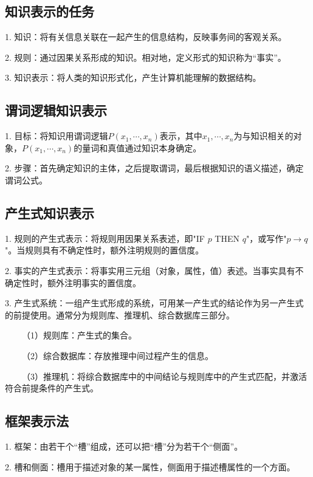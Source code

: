 \begin{tcolorbox}[colback=red!5,colframe=red!75!black]
\end{tcolorbox}

\subsection{知识表示的任务}

1. 知识：将有关信息关联在一起产生的信息结构，反映事务间的客观关系。

2. 规则：通过因果关系形成的知识。相对地，定义形式的知识称为“事实”。

3. 知识表示：将人类的知识形式化，产生计算机能理解的数据结构。

\subsection{谓词逻辑知识表示}

1. 目标：将知识用谓词逻辑$P(x_1,\cdots,x_n)$表示，其中$x_1,\cdots,x_n$为与知识相关的对象，$P(x_1,\cdots,x_n)$的量词和真值通过知识本身确定。

2. 步骤：首先确定知识的主体，之后提取谓词，最后根据知识的语义描述，确定谓词公式。

\subsection{产生式知识表示}

1. 规则的产生式表示：将规则用因果关系表述，即"IF $p$ THEN $q$"，或写作"$p\rightarrow q$"。当规则具有不确定性时，额外注明规则的置信度。

2. 事实的产生式表示：将事实用三元组（对象，属性，值）表述。当事实具有不确定性时，额外注明事实的置信度。

3. 产生式系统：一组产生式形成的系统，可用某一产生式的结论作为另一产生式的前提使用。通常分为规则库、推理机、综合数据库三部分。

~~~~（1）规则库：产生式的集合。

~~~~（2）综合数据库：存放推理中间过程产生的信息。

~~~~（3）推理机：将综合数据库中的中间结论与规则库中的产生式匹配，并激活符合前提条件的产生式。

\subsection{框架表示法}

1. 框架：由若干个“槽”组成，还可以把“槽”分为若干个“侧面”。

2. 槽和侧面：槽用于描述对象的某一属性，侧面用于描述槽属性的一个方面。


